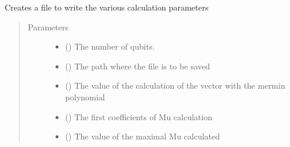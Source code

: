 \documentclass[letterpaper,10pt,english]{sphinxmanual}
\begin{document}

\begin{fulllineitems}
\label{\detokenize{mermin_polynomials-opti:mermin_on_qiskit.hypergraphstates_optimization.mermin_polynomials.mu_file_saving}}
Creates a file to write the various calculation parameters
\begin{quote}\begin{description}
\item[{Parameters}] \leavevmode\begin{itemize}
\item {} 
 () \textendash{} The number of qubits.

\item {} 
 () \textendash{} The path where the file is to be saved

\item {} 
 () \textendash{} The value of the calculation of the vector with the 
mermin polynomial

\item {} 
 (\sphinxstyleliteralemphasis{\sphinxupquote{(}}\sphinxstyleliteralemphasis{\sphinxupquote{(}}\sphinxstyleliteralemphasis{\sphinxupquote{)}}\sphinxstyleliteralemphasis{\sphinxupquote{)}}) \textendash{} The first coefficients of Mu 
calculation

\item {} 
 () \textendash{} The value of the maximal Mu calculated

\end{itemize}

\end{description}\end{quote}

\end{fulllineitems}
\end{document}
